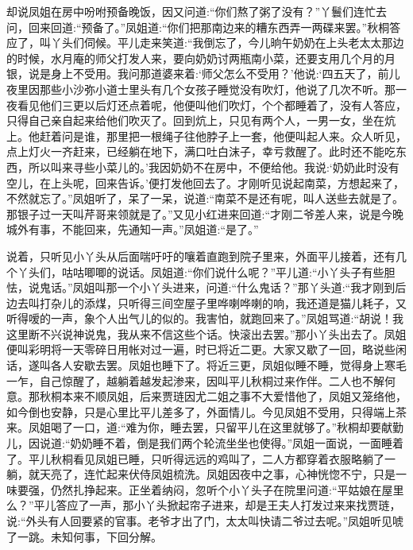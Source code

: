 \begin{parag}
    却说凤姐在房中吩咐预备晚饭，因又问道:“你们熬了粥了没有？”丫鬟们连忙去问，回来回道:“预备了。”凤姐道:“你们把那南边来的糟东西弄一两碟来罢。”秋桐答应了，叫丫头们伺候。平儿走来笑道:“我倒忘了，今儿晌午奶奶在上头老太太那边的时候，水月庵的师父打发人来，要向奶奶讨两瓶南小菜，还要支用几个月的月银，说是身上不受用。我问那道婆来着:‘师父怎么不受用？’他说:‘四五天了，前儿夜里因那些小沙弥小道士里头有几个女孩子睡觉没有吹灯，他说了几次不听。那一夜看见他们三更以后灯还点着呢，他便叫他们吹灯，个个都睡着了，没有人答应，只得自己亲自起来给他们吹灭了。回到炕上，只见有两个人，一男一女，坐在炕上。他赶着问是谁，那里把一根绳子往他脖子上一套，他便叫起人来。众人听见，点上灯火一齐赶来，已经躺在地下，满口吐白沫子，幸亏救醒了。此时还不能吃东西，所以叫来寻些小菜儿的。’我因奶奶不在房中，不便给他。我说:‘奶奶此时没有空儿，在上头呢，回来告诉。’便打发他回去了。才刚听见说起南菜，方想起来了，不然就忘了。”凤姐听了，呆了一呆，说道:“南菜不是还有呢，叫人送些去就是了。那银子过一天叫芹哥来领就是了。”又见小红进来回道:“才刚二爷差人来，说是今晚城外有事，不能回来，先通知一声。”凤姐道:“是了。”
\end{parag}


\begin{parag}
    说着，只听见小丫头从后面喘吁吁的嚷着直跑到院子里来，外面平儿接着，还有几个丫头们，咕咕唧唧的说话。凤姐道:“你们说什么呢？”平儿道:“小丫头子有些胆怯，说鬼话。”凤姐叫那一个小丫头进来，问道:“什么鬼话？”那丫头道:“我才刚到后边去叫打杂儿的添煤，只听得三间空屋子里哗喇哗喇的响，我还道是猫儿耗子，又听得嗳的一声，象个人出气儿的似的。我害怕，就跑回来了。”凤姐骂道:“胡说！我这里断不兴说神说鬼，我从来不信这些个话。快滚出去罢。”那小丫头出去了。凤姐便叫彩明将一天零碎日用帐对过一遍，时已将近二更。大家又歇了一回，略说些闲话，遂叫各人安歇去罢。凤姐也睡下了。将近三更，凤姐似睡不睡，觉得身上寒毛一乍，自己惊醒了，越躺着越发起渗来，因叫平儿秋桐过来作伴。二人也不解何意。那秋桐本来不顺凤姐，后来贾琏因尤二姐之事不大爱惜他了，凤姐又笼络他，如今倒也安静，只是心里比平儿差多了，外面情儿。今见凤姐不受用，只得端上茶来。凤姐喝了一口，道:“难为你，睡去罢，只留平儿在这里就够了。”秋桐却要献勤儿，因说道:“奶奶睡不着，倒是我们两个轮流坐坐也使得。”凤姐一面说，一面睡着了。平儿秋桐看见凤姐已睡，只听得远远的鸡叫了，二人方都穿着衣服略躺了一躺，就天亮了，连忙起来伏侍凤姐梳洗。凤姐因夜中之事，心神恍惚不宁，只是一味要强，仍然扎挣起来。正坐着纳闷，忽听个小丫头子在院里问道:“平姑娘在屋里么？”平儿答应了一声，那小丫头掀起帘子进来，却是王夫人打发过来来找贾琏，说:“外头有人回要紧的官事。老爷才出了门，太太叫快请二爷过去呢。”凤姐听见唬了一跳。未知何事，下回分解。
\end{parag}